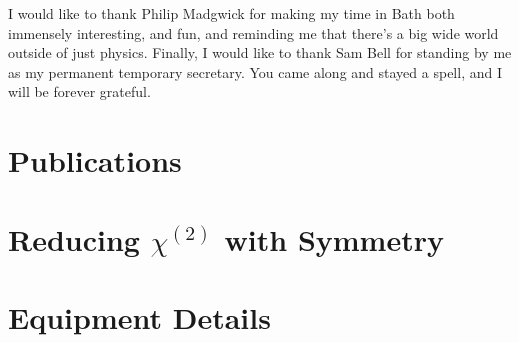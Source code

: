 \documentclass[11pt,a4paper,final]{report}
\begin{document}
I would like to thank Philip Madgwick for making my time in Bath both immensely interesting, and fun, and reminding me that there's a big wide world outside of just physics. Finally, I would like to thank Sam Bell for standing by me as my permanent temporary secretary. You came along and stayed a spell, and I will be forever grateful.

\chapter*{Publications}

\begin{sloppypar}

	\bigskip \noindent {}

	\bigskip \noindent {}

	\bigskip \noindent {}

	\bigskip \noindent {}

	\bigskip \noindent {}

	\bigskip \noindent {}

	\bigskip \noindent {}
\end{sloppypar}












%


\clearpage

\appendix
\chapter{Reducing \texorpdfstring{$\chi^{(2)}$}{Lg} with Symmetry}\label{sec:appendix:rotations}

\chapter{Equipment Details}\label{sec:appendix:Hardware}

\end{document}
